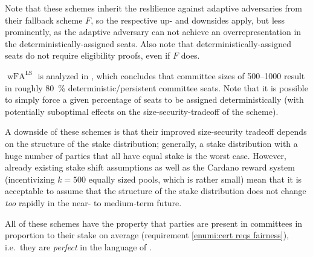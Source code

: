 \begin{enumerate}
  Note that these schemes inherit the reslilience against adaptive adversaries from their fallback scheme $F$, so the respective up- and downsides apply, but less prominently, as the adaptive adversary can not achieve an overrepresentation in the deterministically-assigned seats.
  Also note that deterministically-assigned seats do not require eligibility proofs, even if $F$ does.

  $\operatorname{wFA}^{\operatorname{LS}}$%
  is analyzed in \cite{peras-cert-report}, which concludes that committee sizes of \numrange{500}{1000} result in roughly \qty{80}{\percent} deterministic/persistent committee seats.
  Note that it is possible to simply force a given percentage of seats to be assigned deterministically (with potentially suboptimal effects on the size-security-tradeoff of the scheme).

  A downside of these schemes is that their improved size-security tradeoff depends on the structure of the stake distribution; generally, a stake distribution with a huge number of parties that all have equal stake is the worst case.
  However, already existing stake shift assumptions as well as the Cardano reward system (incentivizing $k = 500$ equally sized pools, which is rather small) mean that it is acceptable to assume that the structure of the stake distribution does not change \emph{too} rapidly in the near- to medium-term future.
\end{enumerate}

All of these schemes have the property that parties are present in committees in proportion to their stake on average (requirement \ref{enumi:cert reqs fairness}), i.e.\ they are \emph{perfect} in the language of \cite{gavzi2023fait}.


